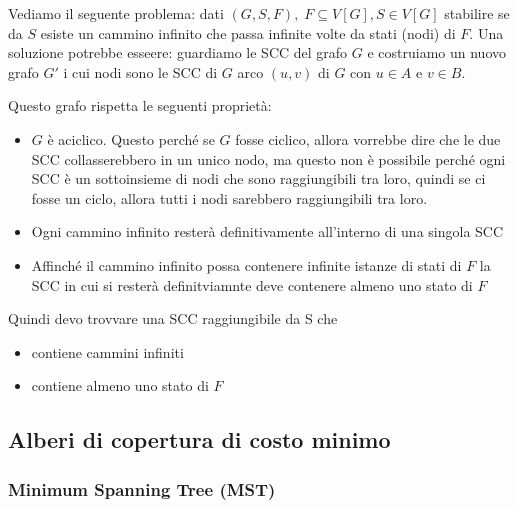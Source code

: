 \documentclass[a4paper]{article}
\begin{document}
\noindent
\ex{}
{
Vediamo il seguente problema: 
dati $(G,S,F),\; F \subseteq V[G], S \in V[G]$ stabilire se da $S$ esiste un cammino infinito che passa infinite volte
da stati (nodi) di $F$.
Una soluzione potrebbe esseere: guardiamo le SCC del grafo $G$ e costruiamo un nuovo grafo $G'$ i cui nodi sono le
SCC di $G$ arco $(u,v)$ di $G$ con $u \in A$ e $v \in B$.

\noindent
Questo grafo rispetta le seguenti proprietà:
\begin{itemize}
  \item $G$ è aciclico. Questo perché se $G$ fosse ciclico, allora vorrebbe dire che le due SCC collasserebbero in un unico nodo, ma questo non è possibile perché
  ogni SCC è un sottoinsieme di nodi che sono raggiungibili tra loro, quindi se ci fosse un ciclo, allora tutti i nodi sarebbero raggiungibili tra loro.
  \item Ogni cammino infinito resterà definitivamente all'interno di una singola SCC
  \item Affinché il cammino infinito possa contenere infinite istanze di stati di $F$ la SCC in cui si resterà definitviamnte 
  deve contenere almeno uno stato di $F$
\end{itemize}
\noindent
Quindi devo trovvare una SCC raggiungibile da S che 
\begin{itemize}
  \item contiene cammini infiniti 
  \item contiene almeno uno stato di $F$
\end{itemize}
}

\subsection{Alberi di copertura di costo minimo}

\subsubsection{Minimum Spanning Tree (MST)}
\end{document}
